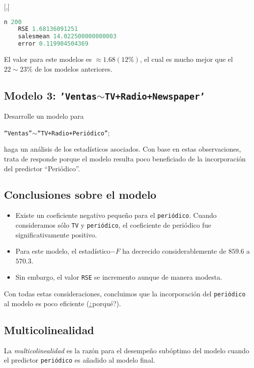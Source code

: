 [,]{}
\begin{lstlisting}[language=Python]
	n 200
	RSE 1.68136091251
	salesmean 14.022500000000003
	error 0.119904504369
\end{lstlisting}


El valor para este modelos es $\approx 1.68 (12\%)$, el cual es mucho mejor que el $22\sim23\%$ de los modelos anteriores.

\subsection{Modelo 3: \texttt{'Ventas$\sim$TV+Radio+Newspaper'}}

\begin{problema}
	Desarrolle un modelo para
	\begin{center}
		\texttt{``Ventas''$\sim$``TV+Radio+Periódico''};
	\end{center}
	haga un análisis de los estadísticos asociados.  Con base en estas observaciones, trata de responde porque el modelo resulta poco beneficiado de la incorporación del predictor ``Periódico''.
\end{problema}


\subsection{Conclusiones sobre el modelo}
\begin{itemize}
	\item Existe un coeficiente negativo pequeño para el \texttt{periódico}.  Cuando consideramos sólo \texttt{TV} y \texttt{periódico}, el coeficiente de periódico fue significativamente positivo. 
	\item Para este modelo, el estadístico$-F$ ha decrecido considerablemente de $859.6$ a $570.3$. 
	\item Sin embargo, el valor \texttt{RSE} se incremento aunque de manera modesta. 
\end{itemize}
Con todas estas consideraciones, concluimos que la incorporación del \texttt{periódico} al modelo es poco eficiente (¿porqué?).

\subsection{Multicolinealidad}

La \emph{multicolinealidad} es la razón para el desempeño subóptimo del modelo cuando el predictor \texttt{periódico} es añadido al modelo final.

